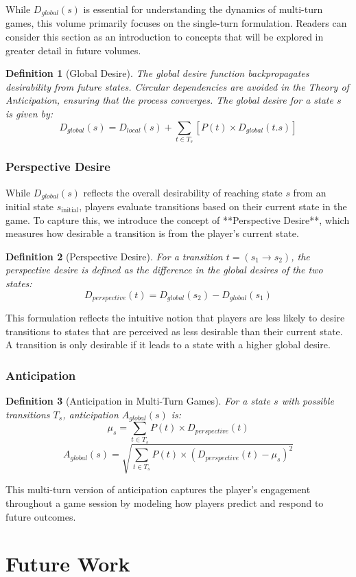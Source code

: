 \documentclass{article}
\newtheorem{definition}{Definition}[]
\begin{document}
While \( D_{global}(s) \) is essential for understanding the dynamics of multi-turn games, this volume primarily focuses on the single-turn formulation. Readers can consider this section as an introduction to concepts that will be explored in greater detail in future volumes.

\begin{definition}[Global Desire]
The global desire function backpropagates desirability from future states. Circular dependencies are avoided in the Theory of Anticipation, ensuring that the process converges. The global desire for a state \( s \) is given by:
\[
D_{global}(s) = D_{local}(s) + \sum_{t \in T_s} \left[ P(t) \times D_{global}(t.s) \right]
\]
\end{definition}

\subsubsection{Perspective Desire}
While \( D_{global}(s) \) reflects the overall desirability of reaching state \( s \) from an initial state \( s_{\text{initial}} \), players evaluate transitions based on their current state in the game. To capture this, we introduce the concept of **Perspective Desire**, which measures how desirable a transition is from the player’s current state.

\begin{definition}[Perspective Desire]
For a transition \( t = (s_1 \rightarrow s_2) \), the perspective desire is defined as the difference in the global desires of the two states:
\[
D_{perspective}(t) = D_{global}(s_2) - D_{global}(s_1)
\]
\end{definition}

This formulation reflects the intuitive notion that players are less likely to desire transitions to states that are perceived as less desirable than their current state. A transition is only desirable if it leads to a state with a higher global desire.

\subsubsection{Anticipation}
\begin{definition}[Anticipation in Multi-Turn Games]
    For a state \( s \) with possible transitions \( T_s \), anticipation $A_{global}(s)$ is:
    \[
        \mu_s = \sum_{t \in T_s} P(t) \times D_{perspective}(t)
    \]
    \[
        A_{global}(s) = \sqrt{\sum_{t \in T_s} P(t) \times (D_{perspective}(t) - \mu_s)^2}
    \]
\end{definition}

This multi-turn version of anticipation captures the player's engagement throughout a game session by modeling how players predict and respond to future outcomes.
    

\section{Future Work}
\end{document}
